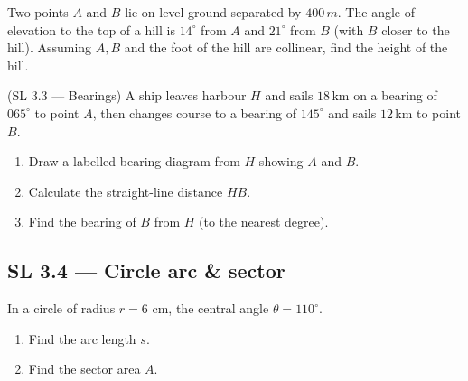 \documentclass[11pt]{article}
\def\textbf#1{#1}%
\def\mathrm#1{#1}%
\newcommand{\tocsubsection}[1]{\subsection{#1}}
\newcounter{question}
\begin{document}
\begin{question}
Two points $A$ and $B$ lie on level ground separated by $400\,\mathrm{m}$.
The angle of elevation to the top of a hill is $14^{\circ}$ from $A$ and
$21^{\circ}$ from $B$ (with $B$ closer to the hill).  Assuming $A,B$ and the
foot of the hill are collinear, find the height of the hill.
\end{question}

\begin{question}
\textbf{(SL 3.3 — Bearings)} A ship leaves harbour $H$ and sails $18\,\text{km}$ on a bearing of $065^\circ$ to point $A$, then changes course to a bearing of $145^\circ$ and sails $12\,\text{km}$ to point $B$. 
\begin{enumerate}
  \item Draw a labelled bearing diagram from $H$ showing $A$ and $B$.
  \item Calculate the straight-line distance $HB$.
  \item Find the bearing of $B$ from $H$ (to the nearest degree).
\end{enumerate}

\end{question}



\tocsubsection{SL 3.4 — Circle arc \& sector}
\begin{question}
In a circle of radius $r=6\text{ cm}$, the central angle $\theta=110^\circ$.
\begin{enumerate}
  \item Find the arc length $s$.
  \item Find the sector area $A$.
\end{enumerate}
\begin{center}
\end{center}
\end{question}
\end{document}
